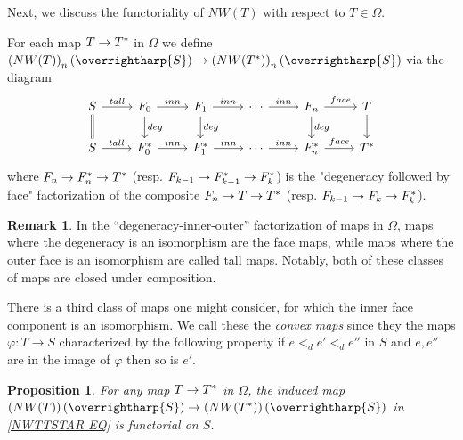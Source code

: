 \documentclass[a4paper,10pt
,draft
]{article}%
\numberwithin{equation}{section}
\numberwithin{figure}{section}
\newtheorem{proposition}[equation]{Proposition}%
\theoremstyle{definition} %
\newtheorem{remark}[equation]{Remark}%
\newcommand{\vect}[1]{\text{\overrightharp{\ensuremath{#1}}}}
\newcommand{\1}{\ensuremath{\mathbbm 1}}%
\begin{document}
Next, we discuss the functoriality of
$NW(T)$ with respect to $T \in \Omega$.

For each map $T \to T^{\**}$ in $\Omega$
we define
$\left(NW(T)\right)_n(\vect{S})
\to 
\left(NW(T^{\**})\right)_n(\vect{S})$
via the diagram
\begin{equation}\label{NWTTSTAR EQ}
\begin{tikzcd}
	S \ar{r}{tall} \ar[equal]{d}
&
	F_0 \ar{r}{inn} \ar{d}{deg}
&
	F_1 \ar{r}{inn} \ar{d}{deg}
&
	\cdots \ar{r}{inn}
&
	F_n \ar{r}{face} \ar{d}{deg}
&
	T \ar{d}
\\
	S \ar{r}{tall} 
&
	F^{\**}_0 \ar{r}{inn}
&
	F^{\**}_1 \ar{r}{inn}
&
	\cdots \ar{r}{inn}
&
	F^{\**}_n \ar{r}{face}
&
	T^{\**}
\end{tikzcd}
\end{equation}
where
$F_n \to F^{\**}_n \to T^{\**}$
(resp. 
$F_{k-1} \to F^{\**}_{k-1} \to F^{\**}_k$)
is the "degeneracy followed by face"
factorization of the composite
$F_n \to T \to T^{\**}$
(resp.
$F_{k-1} \to F_{k} \to F^{\**}_k$).



\begin{remark}\label{OMECONVMAP REM}
In the ``degeneracy-inner-outer''
factorization of maps in $\Omega$,
maps where the degeneracy is an isomorphism are the face maps,
while maps where the outer face is an isomorphism are called tall maps.
Notably, both of these classes of maps are closed under composition.

There is a third class of maps one might consider, 
for which the inner face component is an isomorphism.
We call these the \emph{convex maps}
since they the maps $\varphi \colon T \to S$
characterized by the following property
if $e <_d e' <_d e''$
in $S$ and $e,e''$ are in the image of $\varphi$
then so is $e'$.
\end{remark}



\begin{proposition}
	For any map $T \to T^{\**}$ in $\Omega$, the induced map
	$\left(NW(T)\right)(\vect{S})
	\to 
	\left(NW(T^{\**})\right)(\vect{S})$
	in 
	\eqref{NWTTSTAR EQ}
	is functorial on $S$.
\end{proposition}
\end{document}
